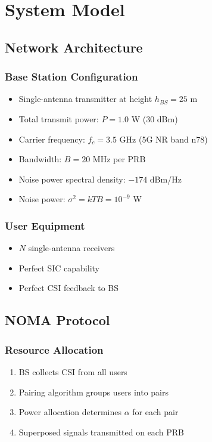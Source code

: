 \chapter{System Model}
\label{chap:system}

\section{Network Architecture}

\subsection{Base Station Configuration}
\begin{itemize}
    \item Single-antenna transmitter at height $h_{BS} = 25$ m
    \item Total transmit power: $P = 1.0$ W (30 dBm)
    \item Carrier frequency: $f_c = 3.5$ GHz (5G NR band n78)
    \item Bandwidth: $B = 20$ MHz per PRB
    \item Noise power spectral density: $-174$ dBm/Hz
    \item Noise power: $\sigma^2 = kTB = 10^{-9}$ W
\end{itemize}

\subsection{User Equipment}
\begin{itemize}
    \item $N$ single-antenna receivers
    \item Perfect SIC capability
    \item Perfect CSI feedback to BS
\end{itemize}

\section{NOMA Protocol}

\subsection{Resource Allocation}
\begin{enumerate}
    \item BS collects CSI from all users
    \item Pairing algorithm groups users into pairs
    \item Power allocation determines $\alpha$ for each pair
    \item Superposed signals transmitted on each PRB
\end{enumerate}

